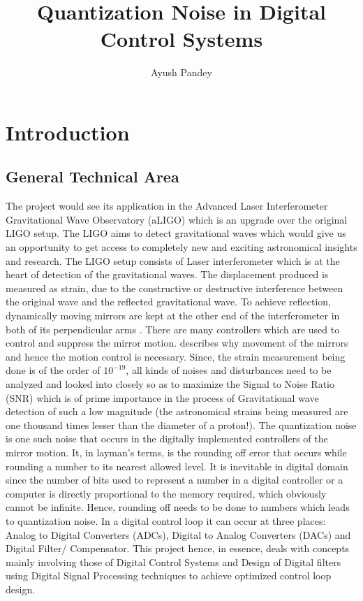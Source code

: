 \documentclass[colorlinks=true,pdfstartview=FitV,linkcolor=blue,
            citecolor=red,urlcolor=magenta]{ligodoc}
\title{Quantization Noise in Digital Control Systems}
\author{Ayush Pandey}
\begin{document}
 \section{Introduction}
     \subsection{General Technical Area}
The project would see its application in the Advanced Laser Interferometer Gravitational Wave Observatory (aLIGO) which is an upgrade over the original LIGO \cite{LIGO} setup. The LIGO aims to detect gravitational waves \cite{GWD} which would give us an opportunity to get access to completely new and exciting astronomical insights and research. The LIGO setup consists of Laser interferometer \cite{Interferometer} which is at the heart of detection of the gravitational waves. The displacement produced is measured as strain, due to the constructive or destructive interference between the original wave and the reflected gravitational wave. To achieve reflection, dynamically moving mirrors are kept at the other end of the interferometer in both of its perpendicular arms \cite{Interferometer}. There are many controllers which are used to control and suppress the mirror motion. \cite{Control} describes why movement of the mirrors and hence the motion control is necessary. Since, the strain measurement being done is of the order of $10^{-19}$, all kinds of noises and disturbances need to be analyzed and looked into closely so as to maximize the Signal to Noise Ratio (SNR) which is of prime importance in the process of Gravitational wave detection of such a low magnitude (the astronomical strains being measured are one thousand times lesser than the diameter of a proton!). The quantization noise is one such noise that occurs in the digitally implemented controllers of the mirror motion. It, in layman's terms, is the rounding off error that occurs while rounding a number to its nearest allowed level. It is inevitable in digital domain since the number of bits used to represent a number in a digital controller or a computer is directly proportional to the memory required, which obviously cannot be infinite. Hence, rounding off needs to be done to numbers which leads to quantization noise. In a digital control loop it can occur at three places: Analog to Digital Converters (ADCs),
Digital to Analog Converters (DACs) and
Digital Filter/ Compensator.
This project hence, in essence, deals with concepts mainly involving those of Digital Control Systems and Design of Digital filters using Digital Signal Processing  techniques to achieve optimized control loop design.
\end{document}
